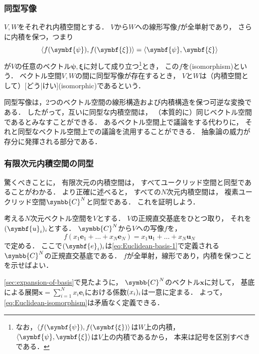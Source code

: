 \documentclass[
]{sotsu}
\newcommand{\bpsi}{\symbf{\psi}}
\newcommand{\bxi}{\symbf{\xi}}
\begin{document}
\subsubsection{同型写像}

$V, W$をそれぞれ内積空間とする．
$V$から$W$への線形写像$f$が全単射であり，
さらに内積を保つ，つまり
\begin{equation*}
    \iparen{f(\bpsi), f(\bxi)} = \iparen{\bpsi, \bxi}
\end{equation*}
が$V$の任意のベクトル$\bpsi, \bxi$に対して成り立つ\footnote{
    なお，$\iparen{f(\bpsi), f(\bxi)}$は$W$上の内積，
    $\iparen{\bpsi, \bxi}$は$V$上の内積であるから，
    本来は記号を区別すべきである．
}とき，
この$f$を(isomorphism)という．
ベクトル空間$V, W$の間に同型写像が存在するとき，
$V$と$W$は（内積空間として）[どう|けい](isomorphic)であるという．

同型写像は，2つのベクトル空間の線形構造および内積構造を保つ可逆な変換である．
したがって，互いに同型な内積空間は，
（本質的に）同じベクトル空間であるとみなすことができる．
あるベクトル空間上で議論をする代わりに，
それと同型なベクトル空間上での議論を流用することができる．
抽象論の威力が存分に発揮される部分である．


\subsubsection{有限次元内積空間の同型}

\quad
驚くべきことに，
有限次元の内積空間は，
すべてユークリッド空間と同型であることがわかる．
より正確に述べると，
すべての$N$次元内積空間は，
複素ユークリッド空間$\symbb{C}^N$と同型である．
これを証明しよう．

考える$N$次元ベクトル空間を$V$とする．
$V$の正規直交基底をひとつ取り，
それを$\sequ{\symbf{u}_i}[i]$とする．
$\symbb{C}^N$から$V$への写像$f$を，
\begin{equation}
    \label{eq:Euclidean-isomorphism}
    f(x_1 \symbf{e}_1 + \dots + x_N \symbf{e}_N)
    = x_1 \symbf{u}_1 + \dots + x_N \symbf{u}_N
\end{equation}
で定める．
ここで$\sequ{\symbf{e}_i}[i]$は\cref{eq:Euclidean-basis-1}で定義される$\symbb{C}^N$の正規直交基底である．
$f$が全単射，線形であり，内積を保つことを示せばよい．

\quad
\cref{sec:expansion-of-basis}で見たように，
$\symbb{C}^N$のベクトル$\symbf{x}$に対して，
基底による展開$\symbf{x} = \sum_{i=1}^{N} x_i \symbf{e}_i$における係数$\sequ{x_i}[i]$は一意に定まる．
よって，\cref{eq:Euclidean-isomorphism}は矛盾なく定義できる．
\end{document}
